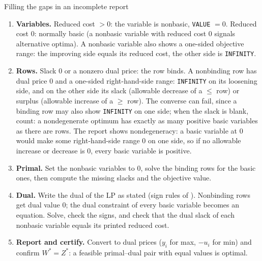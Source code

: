 \begin{rulebox}{Filling the gaps in an incomplete report}
\begin{enumerate}[leftmargin=1.8em,itemsep=0.3ex]
  \item \textbf{Variables.} Reduced cost $>0$: the variable is nonbasic,
        \texttt{VALUE} $=0$. Reduced cost $0$: normally basic (a
        nonbasic variable with reduced cost $0$ signals alternative
        optima). A nonbasic variable also shows a one-sided objective
        range: the improving side equals its reduced cost, the other side
        is \texttt{INFINITY}.
  \item \textbf{Rows.} Slack $0$ or a nonzero dual price: the row binds. A
        nonbinding row has dual price $0$ and a one-sided right-hand-side
        range: \texttt{INFINITY} on its loosening side, and on the other
        side its slack (allowable decrease of a $\le$ row) or surplus
        (allowable increase of a $\ge$ row). The converse can fail, since
        a binding row may also show \texttt{INFINITY} on one side; when
        the slack is blank, count: a nondegenerate optimum has exactly as
        many positive basic variables as there are rows. The report
        shows nondegeneracy: a basic variable at $0$ would make some
        right-hand-side range $0$ on one side, so if no allowable
        increase or decrease is $0$, every basic variable is positive.
  \item \textbf{Primal.} Set the nonbasic variables to $0$, solve the
        binding rows for the basic ones, then compute the missing slacks
        and the objective value.
  \item \textbf{Dual.} Write the dual of the LP as stated (sign rules of
        ). Nonbinding rows get dual value $0$; the dual
        constraint of every basic variable becomes an equation. Solve, check
        the signs, and check that the dual slack of each nonbasic variable
        equals its printed reduced cost.
  \item \textbf{Report and certify.} Convert to dual prices ($y_{i}$ for
        max, $-u_{i}$ for min) and confirm $W^{*}=Z^{*}$: a feasible
        primal--dual pair with equal values is optimal.
\end{enumerate}
\end{rulebox}

